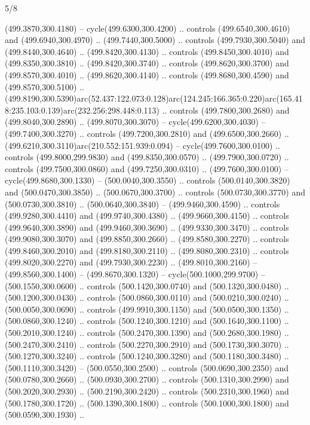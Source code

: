 \begin{flagdescription}{5/8}
\begin{scope}[xshift=0.5\flaglength,yshift=0.5\flagwidth,scale=\flagwidth/475.63]
\begin{scope}[y=0.8pt, x=0.8pt, yscale=-1, xscale=1,shift={(-450,-300)}]
\begin{scope}[cm={{1.0,0.0,0.0,1.0,(-0.0002,0.12556)}},cm={{1.0,0.0,0.0,1.0,(0.00179,0.0)}}]
\begin{scope}[cm={{1.11592,0.0,0.0,1.11592,(-106.89933,-41.77764)}}]
\begin{scope}[draw=black,fill=cfff]
\begin{scope}[fill=black]
  (499.3870,300.4180) -- cycle(499.6300,300.4200) .. controls
  (499.6540,300.4610) and (499.6940,300.4970) .. (499.7440,300.5000) .. controls
  (499.7930,300.5040) and (499.8440,300.4640) .. (499.8420,300.4130) .. controls
  (499.8450,300.4010) and (499.8350,300.3810) .. (499.8420,300.3740) .. controls
  (499.8620,300.3700) and (499.8570,300.4010) .. (499.8620,300.4140) .. controls
  (499.8680,300.4590) and (499.8570,300.5100) ..
  (499.8190,300.5390)arc(52.437:122.073:0.128)arc(124.245:166.365:0.220)arc(165.418:235.103:0.139)arc(232.256:298.448:0.113)
  .. controls (499.7800,300.2680) and (499.8040,300.2890) .. (499.8070,300.3070)
  -- cycle(499.6200,300.4030) -- (499.7400,300.3270) .. controls
  (499.7200,300.2810) and (499.6500,300.2660) ..
  (499.6210,300.3110)arc(210.552:151.939:0.094) -- cycle(499.7600,300.0100) ..
  controls (499.8000,299.9830) and (499.8350,300.0570) .. (499.7900,300.0720) ..
  controls (499.7500,300.0860) and (499.7250,300.0310) .. (499.7600,300.0100) --
  cycle(499.8680,300.1330) -- (500.0040,300.3550) .. controls
  (500.0140,300.3820) and (500.0470,300.3850) .. (500.0670,300.3700) .. controls
  (500.0730,300.3770) and (500.0730,300.3810) .. (500.0640,300.3840) --
  (499.9460,300.4590) .. controls (499.9280,300.4410) and (499.9740,300.4380) ..
  (499.9660,300.4150) .. controls (499.9640,300.3890) and (499.9460,300.3690) ..
  (499.9330,300.3470) .. controls (499.9080,300.3070) and (499.8850,300.2660) ..
  (499.8580,300.2270) .. controls (499.8460,300.2010) and (499.8180,300.2110) ..
  (499.8080,300.2310) .. controls (499.8020,300.2270) and (499.7930,300.2230) ..
  (499.8010,300.2160) -- (499.8560,300.1400) -- (499.8670,300.1320) --
  cycle(500.1000,299.9700) -- (500.1550,300.0600) .. controls
  (500.1420,300.0740) and (500.1320,300.0480) .. (500.1200,300.0430) .. controls
  (500.0860,300.0110) and (500.0210,300.0240) .. (500.0050,300.0690) .. controls
  (499.9910,300.1150) and (500.0500,300.1350) .. (500.0860,300.1240) .. controls
  (500.1240,300.1210) and (500.1640,300.1100) .. (500.2010,300.1240) .. controls
  (500.2470,300.1390) and (500.2680,300.1980) .. (500.2470,300.2410) .. controls
  (500.2270,300.2910) and (500.1730,300.3070) .. (500.1270,300.3240) .. controls
  (500.1240,300.3280) and (500.1180,300.3480) .. (500.1110,300.3420) --
  (500.0550,300.2500) .. controls (500.0690,300.2350) and (500.0780,300.2660) ..
  (500.0930,300.2700) .. controls (500.1310,300.2990) and (500.2020,300.2930) ..
  (500.2190,300.2420) .. controls (500.2310,300.1960) and (500.1780,300.1720) ..
  (500.1390,300.1800) .. controls (500.1000,300.1800) and (500.0590,300.1930) ..

\end{scope}
\end{scope}
\end{scope}
\end{scope}
\end{scope}
\end{scope}
\end{flagdescription}
